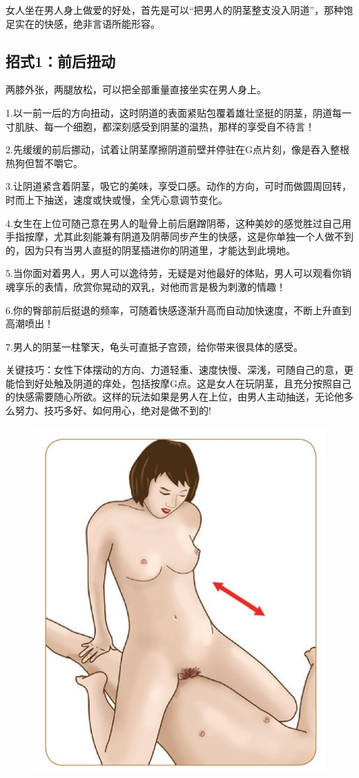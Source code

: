 \documentclass[12pt,UTF8]{ctexbook}
\begin{document}
女人坐在男人身上做爱的好处，首先是可以“把男人的阴茎整支没入阴道”，那种饱足实在的快感，绝非言语所能形容。

\subsection{招式1：前后扭动}

两膝外张，两腿放松，可以把全部重量直接坐实在男人身上。

1.以一前一后的方向扭动，这时阴道的表面紧贴包覆着雄壮坚挺的阴茎，阴道每一寸肌肤、每一个细胞，都深刻感受到阴茎的温热，那样的享受自不待言！

2.先缓缓的前后挪动，试着让阴茎摩擦阴道前壁并停驻在G点片刻，像是吞入整根热狗但暂不嚼它。

3.让阴道紧含着阴茎，吸它的美味，享受口感。动作的方向，可时而做圆周回转，时而上下抽送，速度或快或慢，全凭心意调节变化。

4.女生在上位可随己意在男人的耻骨上前后磨蹭阴蒂，这种美妙的感觉胜过自己用手指按摩，尤其此刻能兼有阴道及阴蒂同步产生的快感，这是你单独一个人做不到的，因为只有当男人直挺的阴茎插进你的阴道里，才能达到此境地。

5.当你面对着男人，男人可以逸待劳，无疑是对他最好的体贴，男人可以观看你销魂享乐的表情，欣赏你晃动的双乳，对他而言是极为刺激的情趣！

6.你的臀部前后挺退的频率，可随着快感逐渐升高而自动加快速度，不断上升直到高潮喷出！

7.男人的阴茎一柱擎天，龟头可直抵子宫颈，给你带来很具体的感受。

关键技巧：女性下体摆动的方向、力道轻重、速度快慢、深浅，可随自己的意，更能恰到好处触及阴道的痒处，包括按摩G点。这是女人在玩阴茎，且充分按照自己的快感需要随心所欲。这样的玩法如果是男人在上位，由男人主动抽送，无论他多么努力、技巧多好、如何用心，绝对是做不到的!

\begin{figure}[htbp]
	\centering
	\includegraphics[width=0.7\linewidth]{24}
	\caption{}
	\label{fig:1}
\end{figure}
\end{document}
